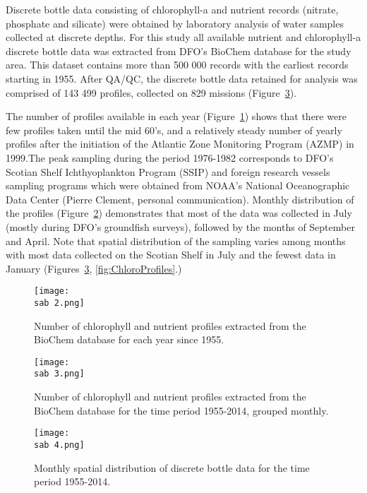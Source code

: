 \documentclass[letterpaper,portrait,11pt]{scrartcl}
\numberwithin{equation}{section}		%
\numberwithin{figure}{section}			%
\numberwithin{table}{section}				%
\newcommand{\ecomod}{\string~/ecomod_data/}   %
\newcommand{\sab}{\ecomod/mpa/sab/}   %
\begin{document}
Discrete bottle data consisting of chlorophyll-a and nutrient records (nitrate, phosphate and silicate) were obtained by laboratory analysis of water samples collected at discrete depths. For this study all available nutrient and chlorophyll-a discrete bottle data was extracted from DFO's BioChem database for the study area. This dataset contains more than 500 000 records with the earliest records starting in 1955. After QA/QC, the discrete bottle data retained for analysis was comprised of 143 499 profiles, collected on 829 missions (Figure~\ref{fig:BottleMap}).



The number of profiles available in each year (Figure~\ref{fig:ChloroMap}) shows that there were few profiles taken until the mid 60's, and a relatively steady number of yearly profiles after the initiation of the Atlantic Zone Monitoring Program (AZMP) in 1999.The peak sampling during the period 1976-1982 corresponds to DFO's Scotian Shelf Ichthyoplankton Program (SSIP) and foreign research vessels sampling programs which were obtained from NOAA's National Oceanographic Data Center (Pierre Clement, personal communication).  Monthly distribution of the profiles (Figure~\ref{fig:ChloroFreq})  demonstrates that most of the data was collected in July (mostly during DFO's groundfish surveys), followed by the months of September and April. Note that spatial distribution of the sampling varies among months with most data collected on the Scotian Shelf in July and the fewest data in January (Figures~\ref{fig:BottleMap}, \ref{fig:ChloroProfiles}.)


\begin{figure}
  \label{fig:ChloroMap}
  \centering
  \texttt{[image: \\sab 2.png]}
  \caption{Number of chlorophyll and nutrient profiles extracted from the BioChem database for each year since 1955.}
\end{figure}

\begin{figure}
  \label{fig:ChloroFreq}
  \centering
  \texttt{[image: \\sab 3.png]}
  \caption{Number of chlorophyll and nutrient profiles extracted from the BioChem database for the time period 1955-2014, grouped monthly.}
\end{figure}

\begin{figure}[h]
  \label{fig:BottleMap}
  \centering
  \texttt{[image: \\sab 4.png]}
  \caption{Monthly spatial distribution of discrete bottle data for the time period 1955-2014.}
\end{figure}
\end{document}
